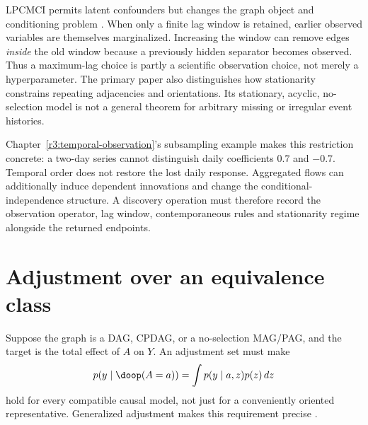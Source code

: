 LPCMCI permits latent confounders but changes the graph object and
conditioning problem \citep[Sections 2.1--2.3]{gerhardus2020}.
When only a finite lag window is retained, earlier observed variables
are themselves marginalized. Increasing the window can remove edges
\emph{inside} the old window because a previously hidden separator
becomes observed. Thus a maximum-lag choice is partly a scientific
observation choice, not merely a hyperparameter. The primary paper also
distinguishes how stationarity constrains repeating adjacencies and
orientations. Its stationary, acyclic, no-selection model is not a
general theorem for arbitrary missing or irregular event histories.

Chapter~\ref{r3:temporal-observation}'s subsampling example makes this
restriction concrete: a two-day series cannot distinguish daily
coefficients $0.7$ and $-0.7$. Temporal order does not restore the lost
daily response. Aggregated flows can additionally induce dependent
innovations and change the conditional-independence structure. A
discovery operation must therefore record the observation operator,
lag window, contemporaneous rules and stationarity regime alongside
the returned endpoints.



\section{Adjustment over an equivalence class}
\label{r3:general-adjustment}
Suppose the graph is a DAG, CPDAG, or a no-selection MAG/PAG, and the
target is the total effect of $A$ on $Y$. An adjustment set must make
\[
 p(y\mid\doop(A=a))=\int p(y\mid a,z)p(z)\,dz
\]
hold for every compatible causal model, not just for a conveniently
oriented representative. Generalized adjustment makes this requirement
precise \citep[Definitions 1--4, Theorem 5]{perkovic2018}.

